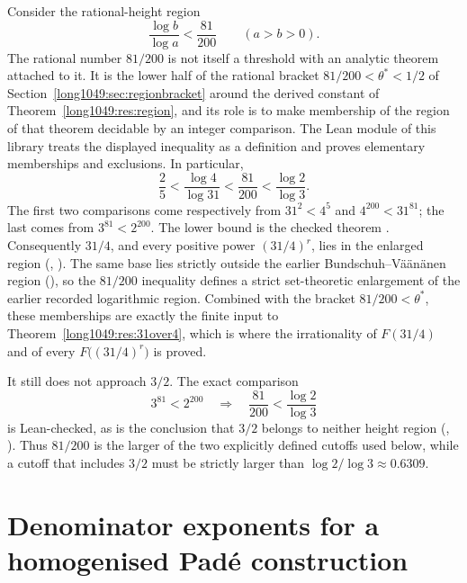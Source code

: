 Consider the rational-height region
\[
 \frac{\log b}{\log a}<\frac{81}{200}
 \qquad(a>b>0).
\]
The rational number $81/200$ is not itself a threshold with an analytic theorem
attached to it.  It is the lower half of the rational bracket
$81/200<\theta^{*}<1/2$ of Section~\ref{long1049:sec:regionbracket} around the derived
constant of Theorem~\ref{long1049:res:region}, and its role is to make membership of the
region of that theorem decidable by an integer comparison.  The Lean module of
this library treats the displayed inequality as a definition and proves
elementary memberships and exclusions.  In particular,
\[
 \frac25
 <\frac{\log4}{\log31}
 <\frac{81}{200}
 <\frac{\log2}{\log3}.
\]
The first two comparisons come respectively from $31^2<4^5$ and
$4^{200}<31^{81}$; the last comes from $3^{81}<2^{200}$.  The lower bound is
the checked theorem
.  Consequently $31/4$, and every positive power $(31/4)^r$, lies
in the enlarged region
(,
).
The same base lies strictly outside the earlier
Bundschuh--V\"a\"an\"anen region
(),
so the $81/200$ inequality defines a strict set-theoretic enlargement of the
earlier recorded logarithmic region.  Combined with the bracket
$81/200<\theta^{*}$, these memberships are exactly the finite input to
Theorem~\ref{long1049:res:31over4}, which is where the irrationality of $F(31/4)$ and of
every $F\bigl((31/4)^{r}\bigr)$ is proved.

It still does not approach $3/2$.  The exact comparison
\[
 3^{81}<2^{200}
 \quad\Longrightarrow\quad
 \frac{81}{200}<\frac{\log2}{\log3}
\]
is Lean-checked, as is the conclusion that $3/2$ belongs to neither height
region
(,
).
Thus $81/200$ is the larger of the two explicitly defined cutoffs used below,
while a cutoff that includes $3/2$ must be strictly larger than
$\log2/\log3\approx0.6309$.

\section{Denominator exponents for a homogenised Pad\'e
construction}\label{long1049:sec:pade}

